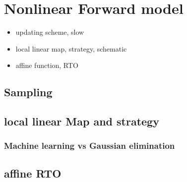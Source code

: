 \chapter{Nonlinear Forward model}
\begin{itemize}
	\item updating scheme, slow
	\item local linear map, strategy, schematic
	\item affine function, RTO
\end{itemize}
\section{Sampling}
\section{local linear Map and strategy}
\subsection{Machine learning vs Gaussian elimination}
\section{affine RTO}